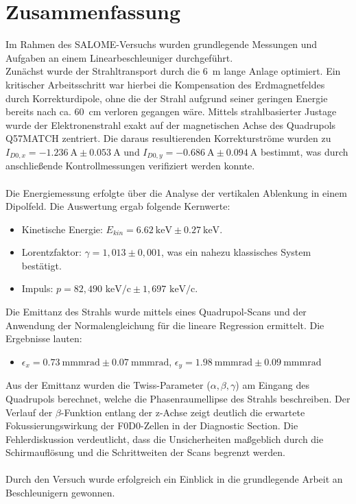 \documentclass[10pt,a4paper, bibliography=totoc]{scrartcl}
\begin{document}
\section{Zusammenfassung}
Im Rahmen des SALOME-Versuchs wurden grundlegende Messungen und Aufgaben an einem Linearbeschleuniger durchgeführt.\\
Zunächst wurde der Strahltransport durch die \qty{6}{m} lange Anlage optimiert. Ein kritischer Arbeitsschritt war hierbei die Kompensation des Erdmagnetfeldes durch Korrekturdipole, ohne die der Strahl aufgrund seiner geringen Energie bereits nach ca. \qty{60}{cm} verloren gegangen wäre. Mittels strahlbasierter Justage wurde der Elektronenstrahl exakt auf der magnetischen Achse des Quadrupols Q57MATCH zentriert. Die daraus resultierenden Korrekturströme wurden zu $I_{D0,x} = \qty{-1,236}{\A} \pm \qty{0,053}{\A}$ und $I_{D0,y} = \qty{-0,686}{\A} \pm \qty{0,094}{\A}$ bestimmt, was durch anschließende Kontrollmessungen verifiziert werden konnte.\\\\
Die Energiemessung erfolgte über die Analyse der vertikalen Ablenkung in einem Dipolfeld. Die Auswertung ergab folgende Kernwerte:
\begin{itemize}
    \item Kinetische Energie: $E_{kin} = \qty{6,62}{\keV} \pm \qty{0,27}{\keV}$.
    \item Lorentzfaktor: $\gamma = 1,013 \pm 0,001$, was ein nahezu klassisches System bestätigt.
    \item Impuls: $p = 82,490 \text{ keV/c} \pm 1,697 \text{ keV/c}$.
\end{itemize}
Die Emittanz des Strahls wurde mittels eines Quadrupol-Scans und der Anwendung der Normalengleichung für die lineare Regression ermittelt. Die Ergebnisse lauten:
\begin{itemize}
    \item $\epsilon_x = \qty{0,73}{\milli\metre\milli\radian} \pm \qty{0,07}{\milli\metre\milli\radian}$, $\epsilon_y = \qty{1,98}{\milli\metre\milli\radian} \pm \qty{0,09}{\milli\metre\milli\radian}$
\end{itemize}
Aus der Emittanz wurden die Twiss-Parameter ($\alpha, \beta, \gamma$) am Eingang des Quadrupols berechnet, welche die Phasenraumellipse des Strahls beschreiben. Der Verlauf der $\beta$-Funktion entlang der z-Achse zeigt deutlich die erwartete Fokussierungswirkung der F0D0-Zellen in der Diagnostic Section. Die Fehlerdiskussion verdeutlicht, dass die Unsicherheiten maßgeblich durch die Schirmauflösung und die Schrittweiten der Scans begrenzt werden.\\\\
Durch den Versuch wurde erfolgreich ein Einblick in die grundlegende Arbeit an Beschleunigern gewonnen. 
\end{document}
